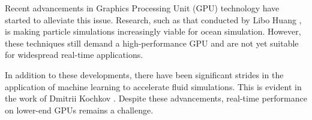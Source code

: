 Recent advancements in Graphics Processing Unit (GPU) technology have started to alleviate this issue. Research, such as that conducted by Libo Huang \cite{huang2021}, is making particle simulations increasingly viable for ocean simulation. However, these techniques still demand a high-performance GPU and are not yet suitable for widespread real-time applications.

In addition to these developments, there have been significant strides in the application of machine learning to accelerate fluid simulations. This is evident in the work of Dmitrii Kochkov \cite{kochkov2021machine}. Despite these advancements, real-time performance on lower-end GPUs remains a challenge.










